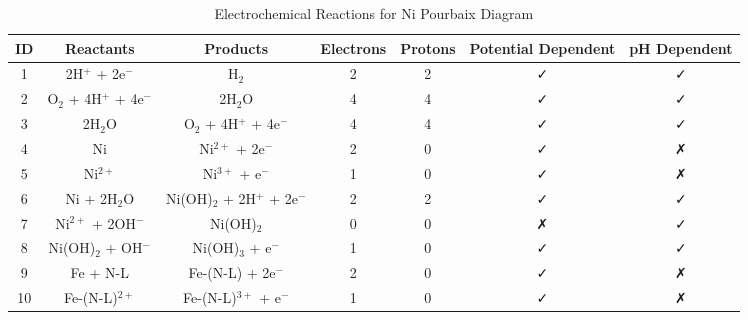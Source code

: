 \begin{table}
\caption{Electrochemical Reactions for Ni Pourbaix Diagram}
\label{tab:ni_reactions}
\begin{tabular}{ccccccc}
\toprule
ID & Reactants & Products & Electrons & Protons & Potential Dependent & pH Dependent \\
\midrule
1 & 2H$^+$ + 2e$^-$ & H$_2$ & 2 & 2 & ✓ & ✓ \\
2 & O$_2$ + 4H$^+$ + 4e$^-$ & 2H$_2$O & 4 & 4 & ✓ & ✓ \\
3 & 2H$_2$O & O$_2$ + 4H$^+$ + 4e$^-$ & 4 & 4 & ✓ & ✓ \\
4 & Ni & Ni$^{2+}$ + 2e$^-$ & 2 & 0 & ✓ & ✗ \\
5 & Ni$^{2+}$ & Ni$^{3+}$ + e$^-$ & 1 & 0 & ✓ & ✗ \\
6 & Ni + 2H$_2$O & Ni(OH)$_2$ + 2H$^+$ + 2e$^-$ & 2 & 2 & ✓ & ✓ \\
7 & Ni$^{2+}$ + 2OH$^-$ & Ni(OH)$_2$ & 0 & 0 & ✗ & ✓ \\
8 & Ni(OH)$_2$ + OH$^-$ & Ni(OH)$_3$ + e$^-$ & 1 & 0 & ✓ & ✓ \\
9 & Fe + N-L & Fe-(N-L) + 2e$^-$ & 2 & 0 & ✓ & ✗ \\
10 & Fe-(N-L)$^{2+}$ & Fe-(N-L)$^{3+}$ + e$^-$ & 1 & 0 & ✓ & ✗ \\
\bottomrule
\end{tabular}
\end{table}
